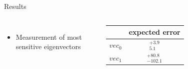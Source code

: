 \begin{frame}{Results}


\begin{columns}
\begin{itemize}
    \item Measurement of most sensitive eigenvectors
\end{itemize}

\begin{table}[]
    \centering
    \begin{tabular}{lc}
    \hline\hline
         & expected error \\
    \hline    
        $vec_{0}$ & $^{+3.9}_{5.1}$ \\
        $vec_{1}$ & $^{+80.8}_{-102.1}$ \\
    \hline \hline    
    \end{tabular}
\end{table}


\end{columns}
\end{frame}
